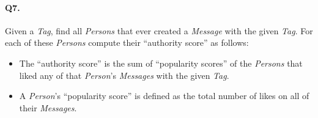 \paragraph{Q7.}
Given a \emph{Tag}, find all \emph{Persons} that ever created a
\emph{Message} with the given \emph{Tag}. For each of these
\emph{Persons} compute their ``authority score'' as follows:
\begin{itemize}
\tightlist
\item
  The ``authority score'' is the sum of ``popularity scores'' of the
  \emph{Persons} that liked any of that \emph{Person}'s \emph{Messages}
  with the given \emph{Tag}.
\item
  A \emph{Person}'s ``popularity score'' is defined as the total number
  of likes on all of their \emph{Messages}.
\end{itemize}

